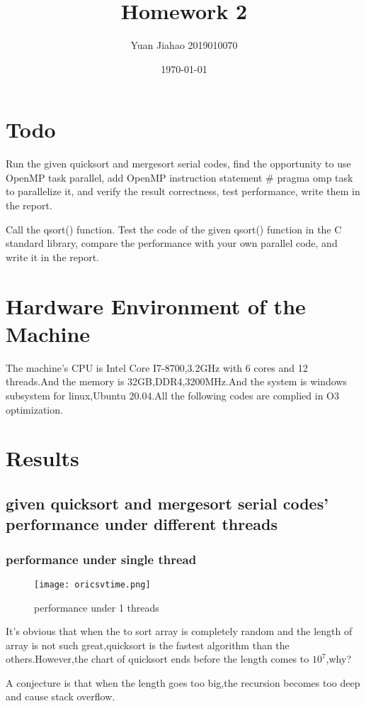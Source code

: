 \documentclass[11pt]{scrartcl} %
\title{	
	Homework 2
}
\author{Yuan Jiahao 2019010070} %
\date{\normalsize\today} %
\begin{document}
\maketitle %

\section{Todo}

Run the given quicksort and mergesort serial codes, find the opportunity to use OpenMP
task parallel, add OpenMP instruction statement \# pragma omp task to parallelize it, and verify
the result correctness, test performance, write them in the report.

Call the qsort() function. Test the code of the given qsort() function in the C standard
library, compare the performance with your own parallel code, and write it in the report.

\section{Hardware Environment of the Machine }
The machine's CPU is Intel Core I7-8700,3.2GHz with 6 cores and 12 threads.And the memory is 32GB,DDR4,3200MHz.And the system is windows subsystem for linux,Ubuntu 20.04.All the following codes are complied in O3 optimization.

\section{Results}
	\subsection{given quicksort and mergesort serial codes' performance under different threads }
	\subsubsection{performance under single thread }
	\begin{figure}[H]
		\centering
		\texttt{[image: oricsvtime.png]}
		\caption{performance under 1 threads}
		\label{f1}
	\end{figure}
	It's obvious that when the to sort array is completely random and the length of array is not such great,quicksort is the fastest algorithm than the others.However,the chart of quicksort ends before the length comes to $10^7$,why?

	A conjecture is that when the length goes too big,the recursion becomes too deep and cause stack overflow.
\end{document}
